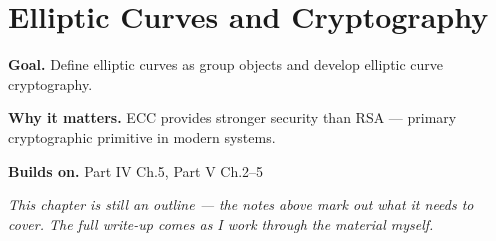 \chapter{Elliptic Curves and Cryptography}
\label{ch:05-number-theory-09}

\begin{chapterintro}
\textbf{Goal.} Define elliptic curves as group objects and develop elliptic curve cryptography.

\textbf{Why it matters.} ECC provides stronger security than RSA — primary cryptographic primitive in modern systems.

\textbf{Builds on.} Part IV Ch.5, Part V Ch.2–5
\end{chapterintro}

\textit{This chapter is still an outline --- the notes above mark out what it needs to cover. The full write-up comes as I work through the material myself.}
